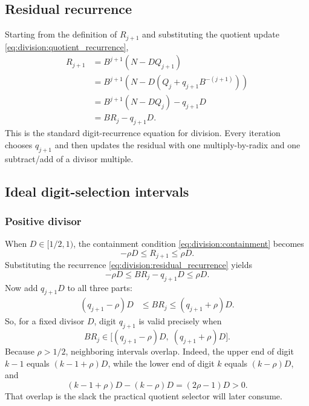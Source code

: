\documentclass[11pt]{article}
\numberwithin{equation}{section}
\begin{document}
\subsection{Residual recurrence}
\label{ssec:division:residual_recurrence}

Starting from the definition of $R_{j+1}$ and substituting the quotient update
\cref{eq:division:quotient_recurrence},
\begin{align}
  R_{j+1}
  &= B^{j+1}(N-DQ_{j+1}) \nonumber \\
  &= B^{j+1}\left(N-D\left(Q_j + q_{j+1}B^{-(j+1)}\right)\right) \nonumber \\
  &= B^{j+1}(N-DQ_j) - q_{j+1}D \nonumber \\
  &= BR_j - q_{j+1}D.
  \label{eq:division:residual_recurrence}
\end{align}
This is the standard digit-recurrence equation for division.
Every iteration chooses $q_{j+1}$ and then updates the residual with one multiply-by-radix and one
subtract/add of a divisor multiple.

\subsection{Ideal digit-selection intervals}
\label{ssec:division:ideal_intervals}

\subsubsection{Positive divisor}
\label{sssec:division:positive_divisor}

When $D \in [1/2,1)$, the containment condition \cref{eq:division:containment} becomes
\begin{equation}
  \label{eq:division:containment_pos}
  -\rho D \le R_{j+1} \le \rho D.
\end{equation}
Substituting the recurrence \cref{eq:division:residual_recurrence} yields
\begin{equation}
  \label{eq:division:selection_sub_pos}
  -\rho D \le BR_j - q_{j+1}D \le \rho D.
\end{equation}
Now add $q_{j+1}D$ to all three parts:
\begin{align}
  (q_{j+1}-\rho)D
  &\le BR_j \le (q_{j+1}+\rho)D.
  \label{eq:division:selection_interval_pos}
\end{align}
So, for a fixed divisor $D$, digit $q_{j+1}$ is valid precisely when
\[
  BR_j \in \bigl[(q_{j+1}-\rho)D,\; (q_{j+1}+\rho)D\bigr].
\]
Because $\rho > 1/2$, neighboring intervals overlap.
Indeed, the upper end of digit $k-1$ equals $(k-1+\rho)D$, while the lower end of digit $k$ equals
$(k-\rho)D$, and
\[
  (k-1+\rho)D - (k-\rho)D = (2\rho-1)D > 0.
\]
That overlap is the slack the practical quotient selector will later consume.
\end{document}
